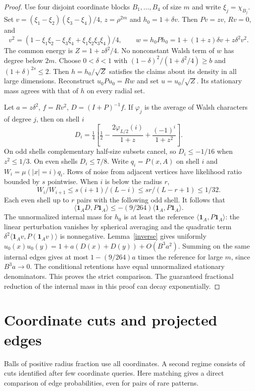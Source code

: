 \documentclass[11pt]{article}
\newcommand{\one}{\mathbf1}
\newcommand{\ip}[2]{\langle #1,#2\rangle}
\begin{document}
\begin{proof}
Use four disjoint coordinate blocks $B_1,\ldots,B_4$ of size $m$ and write $\xi_j=\chi_{B_j}$. Set $v=(\xi_1-\xi_2)(\xi_3-\xi_4)/4$, $z=\rho^{2m}$ and $h_0=1+\delta v$. Then $Pv=zv$, $Rv=0$, and
\[
 v^2=(1-\xi_1\xi_2-\xi_3\xi_4+\xi_1\xi_2\xi_3\xi_4)/4,\qquad
 w=h_0Ph_0=1+(1+z)\delta v+z\delta^2 v^2 .
\]
The common energy is $Z=1+z\delta^2/4$. No nonconstant Walsh term of $w$ has degree below $2m$. Choose $0<\delta<1$ with $(1-\delta)^2/(1+\delta^2/4)\ge b$ and $(1+\delta)^{2s}\le 2$. Then $h=h_0/\sqrt Z$ satisfies the claims about its density in all large dimensions. Reconstruct $u_0Pu_0=Rw$ and set $u=u_0/\sqrt Z$. Its stationary mass agrees with that of $h$ on every radial set.

Let $a=z\delta^2$, $f=Rv^2$, $D=(I+P)^{-1}f$. If $\varphi_j$ is the average of Walsh characters of degree $j$, then on shell $i$
\[
 D_i=\tfrac14\left[\tfrac12-\frac{2\varphi_{L/2}(i)}{1+z}
                            +\frac{(-1)^i}{1+z^2}\right].
\]
On odd shells complementary half-size subsets cancel, so $D_i\le-1/16$ when $z^2\le1/3$. On even shells $D_i\le7/8$. Write $q_i=P(x,A)$ on shell $i$ and $W_i=\mu(|x|=i)q_i$. Rows of noise from adjacent vertices have likelihood ratio bounded by $s$ pointwise. When $i$ is below the radius $r$,
\[
 W_i/W_{i+1}\le s(i+1)/(L-i)\le sr/(L-r+1)\le 1/32.
\]
Each even shell up to $r$ pairs with the following odd shell. It follows that
\[
 \ip{\one_A D}{P\one_A}\le -(9/264)\ip{\one_A}{P\one_A}.
\]
The unnormalized internal mass for $h_0$ is at least the reference $\ip{\one_A}{P\one_A}$: the linear perturbation vanishes by spherical averaging and the quadratic term $\delta^2\ip{\one_A v}{P(\one_A v)}$ is nonnegative. Lemma~\ref{inverse} gives uniformly
$u_0(x)u_0(y)=1+a(D(x)+D(y))+O(B^3a^2)$.
Summing on the same internal edges gives at most $1-(9/264)a$ times the reference for large $m$, since $B^3a\to0$. The conditional retentions have equal unnormalized stationary denominators. This proves the strict comparison. The guaranteed fractional reduction of the internal mass in this proof can decay exponentially.
\end{proof}

\section{Coordinate cuts and projected edges}
Balls of positive radius fraction use all coordinates. A second regime consists of cuts identified after few coordinate queries. Here matching gives a direct comparison of edge probabilities, even for pairs of rare patterns.
\end{document}
